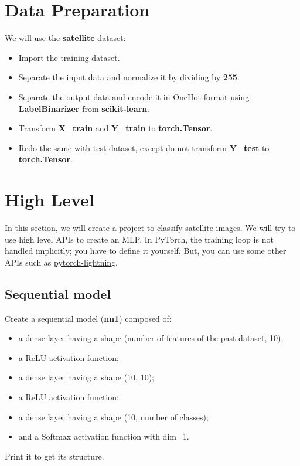 \documentclass[11pt, a4paper]{article}
\begin{document}
\begin{multicols}{2}
	\section{Data Preparation}
	
	We will use the \textbf{satellite} dataset:
	\begin{itemize} 
		\item Import the training dataset. 
		\item Separate the input data and normalize it by dividing by \textbf{255}. 
		\item Separate the output data and encode it in OneHot format using \textbf{LabelBinarizer} from \textbf{scikit-learn}.
		\item Transform \textbf{X\_train} and \textbf{Y\_train} to \textbf{torch.Tensor}.
		\item Redo the same with test dataset, except do not transform \textbf{Y\_test} to \textbf{torch.Tensor}.
	\end{itemize}
	
	\section{High Level}
	
	In this section, we will create a project to classify satellite images.
	We will try to use high level APIs to create an MLP.
	In PyTorch, the training loop is not handled implicitly; you have to define it yourself.
	But, you can use some other APIs such as \href{https://github.com/Lightning-AI/pytorch-lightning}{pytorch-lightning}.
	
	\subsection{Sequential model}
	
	Create a sequential model (\textbf{nn1}) composed of:
	\begin{itemize} 
		\item a dense layer having a shape (number of features of the past dataset, 10);
		\item a ReLU activation function;
		\item a dense layer having a shape (10, 10);
		\item a ReLU activation function;
		\item a dense layer having a shape (10, number of classes);
		\item and a Softmax activation function with dim=1.
	\end{itemize}
	Print it to get its structure.
	

\end{multicols}
\end{document}
